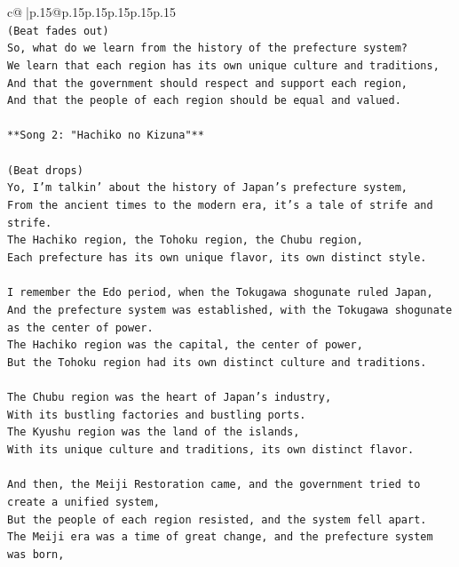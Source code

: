 \documentclass{article}
\begin{document}
{\begin{supertabular}{c@{$\;$}|p{.15\linewidth}@{}p{.15\linewidth}p{.15\linewidth}p{.15\linewidth}p{.15\linewidth}p{.15\linewidth}}
{{{\\ 
\texttt{(Beat fades out)} \\
\texttt{So, what do we learn from the history of the prefecture system?} \\
\texttt{We learn that each region has its own unique culture and traditions,} \\
\texttt{And that the government should respect and support each region,} \\
\texttt{And that the people of each region should be equal and valued.} \\
\\ 
\texttt{**Song 2: "Hachiko no Kizuna"**} \\
\\ 
\texttt{(Beat drops)} \\
\texttt{Yo, I'm talkin' about the history of Japan's prefecture system,} \\
\texttt{From the ancient times to the modern era, it's a tale of strife and strife.} \\
\texttt{The Hachiko region, the Tohoku region, the Chubu region,} \\
\texttt{Each prefecture has its own unique flavor, its own distinct style.} \\
\\ 
\texttt{I remember the Edo period, when the Tokugawa shogunate ruled Japan,} \\
\texttt{And the prefecture system was established, with the Tokugawa shogunate as the center of power.} \\
\texttt{The Hachiko region was the capital, the center of power,} \\
\texttt{But the Tohoku region had its own distinct culture and traditions.} \\
\\ 
\texttt{The Chubu region was the heart of Japan's industry,} \\
\texttt{With its bustling factories and bustling ports.} \\
\texttt{The Kyushu region was the land of the islands,} \\
\texttt{With its unique culture and traditions, its own distinct flavor.} \\
\\ 
\texttt{And then, the Meiji Restoration came, and the government tried to create a unified system,} \\
\texttt{But the people of each region resisted, and the system fell apart.} \\
\texttt{The Meiji era was a time of great change, and the prefecture system was born,} \\
}}}
\end{supertabular}}
\end{document}
